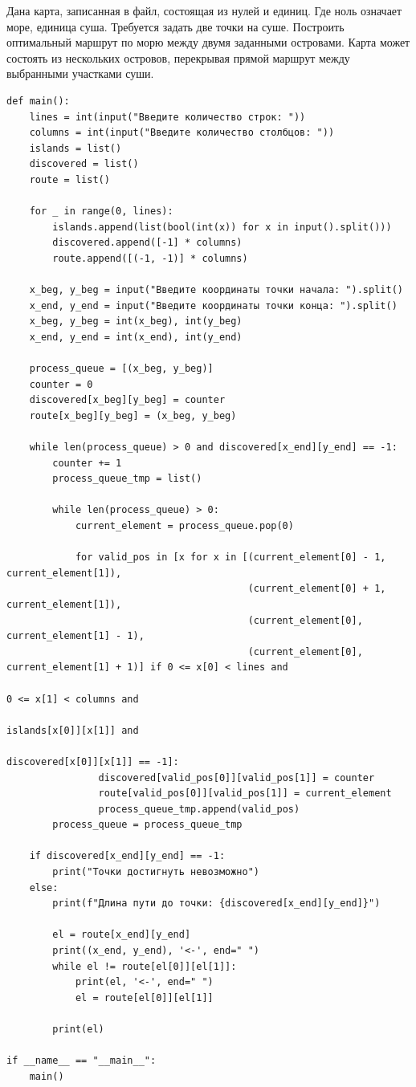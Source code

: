 \documentclass[a4paper,14pt]{extarticle}
\begin{document}
Дана карта, записанная в файл, состоящая из нулей и единиц. Где ноль
означает море, единица суша. Требуется задать две точки на суше. Построить
оптимальный маршрут по морю между двумя заданными островами. Карта
может состоять из нескольких островов, перекрывая прямой маршрут между
выбранными участками суши.\\
\begin{verbatim}
def main():
    lines = int(input("Введите количество строк: "))
    columns = int(input("Введите количество столбцов: "))
    islands = list()
    discovered = list()
    route = list()

    for _ in range(0, lines):
        islands.append(list(bool(int(x)) for x in input().split()))
        discovered.append([-1] * columns)
        route.append([(-1, -1)] * columns)

    x_beg, y_beg = input("Введите координаты точки начала: ").split()
    x_end, y_end = input("Введите координаты точки конца: ").split()
    x_beg, y_beg = int(x_beg), int(y_beg)
    x_end, y_end = int(x_end), int(y_end)

    process_queue = [(x_beg, y_beg)]
    counter = 0
    discovered[x_beg][y_beg] = counter
    route[x_beg][y_beg] = (x_beg, y_beg)

    while len(process_queue) > 0 and discovered[x_end][y_end] == -1:
        counter += 1
        process_queue_tmp = list()

        while len(process_queue) > 0:
            current_element = process_queue.pop(0)

            for valid_pos in [x for x in [(current_element[0] - 1, current_element[1]),
                                          (current_element[0] + 1, current_element[1]),
                                          (current_element[0], current_element[1] - 1),
                                          (current_element[0], current_element[1] + 1)] if 0 <= x[0] < lines and
                                                                                           0 <= x[1] < columns and
                                                                                           islands[x[0]][x[1]] and
                                                                                           discovered[x[0]][x[1]] == -1]:
                discovered[valid_pos[0]][valid_pos[1]] = counter
                route[valid_pos[0]][valid_pos[1]] = current_element
                process_queue_tmp.append(valid_pos)
        process_queue = process_queue_tmp

    if discovered[x_end][y_end] == -1:
        print("Точки достигнуть невозможно")
    else:
        print(f"Длина пути до точки: {discovered[x_end][y_end]}")

        el = route[x_end][y_end]
        print((x_end, y_end), '<-', end=" ")
        while el != route[el[0]][el[1]]:
            print(el, '<-', end=" ")
            el = route[el[0]][el[1]]

        print(el)

if __name__ == "__main__":
    main()
\end{verbatim}
\end{document}
